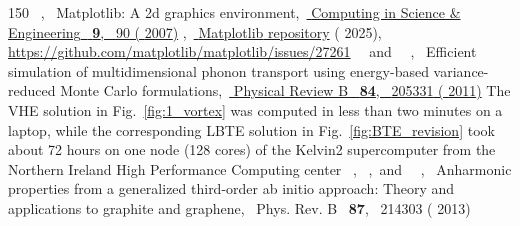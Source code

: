 \documentclass[
prb,
twocolumn,
superscriptaddress,
 amsmath,amssymb,
 aps,
longbibliography,
]{revtex4-2}
\begin{document}
\begin{thebibliography}{150}
  \BibitemOpen
   { {\ },\ } { {Matplotlib: A 2d graphics environment},\ }\href {https://doi.org/10.1109/MCSE.2007.55} { { {Computing in Science \& Engineering}\ }\textbf { {9}},\  {90} ( {2007})}
  \BibitemOpen
   { {},\ }\href {https://github.com/matplotlib/matplotlib/issues/27261} { {{Matplotlib} repository}} ( {2025}),\  {\url{https://github.com/matplotlib/matplotlib/issues/27261}}
  \BibitemOpen
   { {\ }\ and\  {\ },\ } { {Efficient simulation of multidimensional phonon transport using energy-based variance-reduced {Monte} {Carlo} formulations},\ }\href {https://doi.org/10.1103/PhysRevB.84.205331} { { {Physical Review B}\ }\textbf { {84}},\  {205331} ( {2011})}
  \BibitemOpen
   {The VHE solution in Fig.~\ref {fig:1_vortex} was computed in less than two minutes on a laptop, while the corresponding LBTE solution in Fig.~\ref {fig:BTE_revision} took about 72 hours on one node (128 cores) of the Kelvin2 supercomputer from the Northern Ireland High Performance Computing center}
  \BibitemOpen
   { {~},  {~},\ and\  {~},\ } { {{Anharmonic properties from a generalized third-order ab initio approach: Theory and applications to graphite and graphene}},\ }\href@noop {} { { {Phys. Rev. B}\ }\textbf { {87}},\  {214303} ( {2013})}

\end{thebibliography}
\end{document}
